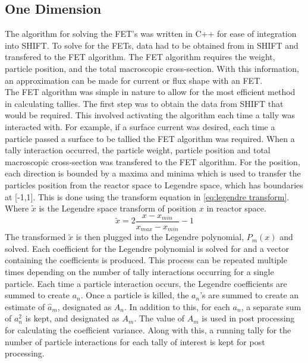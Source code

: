 \documentclass[10tma4paper]{article}
\begin{document}
\subsection{One Dimension}\label{alg oned}
The algorithm for solving the FET's was written in C++ for ease of integration into SHIFT. To solve for the FETs, data had to be obtained from in SHIFT and transfered to the FET algorithm. The FET algorithm requires the weight, particle position, and the total macroscopic cross-section. With this information, an approximation can be made for current or flux shape with an FET.
\\
The FET algorithm was simple in nature to allow for the most efficient method in calculating tallies. The first step was to obtain the data from SHIFT that would be required. This involved activating the algorithm each time a tally was interacted with. For example, if a surface current was desired, each time a particle passed a surface to be tallied the FET algorithm was required. When a tally interaction occurred, the particle weight, particle position and total macroscopic cross-section was transfered to the FET algorithm. For the position, each direction is bounded by a maxima and minima which is used to transfer the particles position from the reactor space to Legendre space, which has boundaries at [-1,1]. This is done using the transform equation in \eqref{eq:legendre transform}. Where $\tilde{x}$ is the Legendre space transform of position $x$ in reactor space.
\begin{equation} \label{eq:legendre transform}
\tilde{x} = 2 \frac{x-x_{min}}{x_{max}-x_{min}} - 1
\end{equation}
The transformed $\tilde{x}$ is then plugged into the Legendre polynomial, $P_{m}(x)$ and solved. Each coefficient for the Legendre polynomial is solved for and a vector containing the coefficients is produced. This process can be repeated multiple times depending on the number of tally interactions occurring for a single particle. Each time a particle interaction occurs, the Legendre coefficients are summed to create $a_{n}$. Once a particle is killed, the $a_{n}$'s are summed to create an estimate of $\hat{a}_{m}$, designated as $A_{n}$. In addition to this, for each $a_{n}$, a separate sum of $a_{n}^{2}$ is kept, and designated as $A_{m}$. The value of $A_{m}$ is used in post processing for calculating the coefficient variance. Along with this, a running tally for the number of particle interactions for each tally of interest is kept for post processing.
\\
\end{document}
